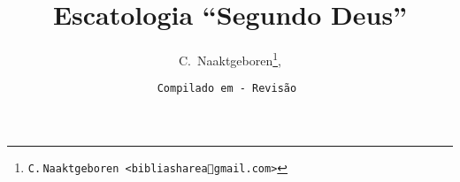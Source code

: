 \makeatletter
\immediate{}
\immediate{}
\makeatother
\title{\textbf{Escatologia ``Segundo Deus''}}
\author{C.~Naaktgeboren\thanks{\texttt{C.$\,$Naaktgeboren <bibliashare\textcircled{a}gmail.com>}},}
\date{{\scriptsize\texttt{Compilado em  - Revisão }}}
